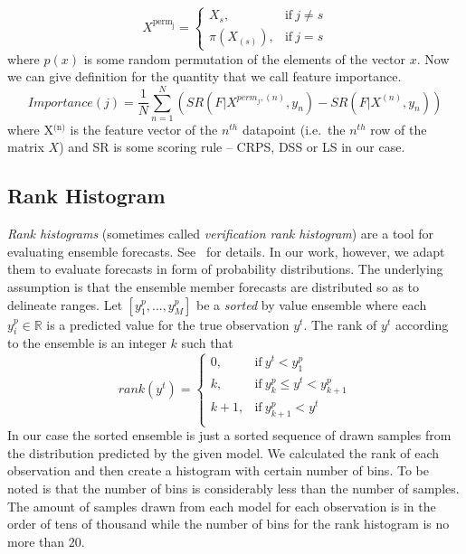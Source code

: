 \documentclass[12pt,a4paper,twoside]{scrartcl}
\numberwithin{equation}{section}
\begin{document}
\begin{equation}
  X^{\text{perm}_{\text{j}}} = 
  \begin{cases}
    X_{s},        & \text{if}\  j \neq s \\
    \pi(X_{(s)}), & \text{if}\  j = s
  \end{cases}
\end{equation}
where \(p(x)\) is some random permutation of the elements of the vector \(x\). Now we can give definition for the quantity that we call feature importance.
\begin{equation}
  \textit{Importance}(j) = \frac{1}{N}\sum_{n=1}^N (SR(F|X^{perm_j,(n)}, y_n) - SR(F|X^{(n)}, y_n) )
\end{equation}
where X\(^{\text{(n)}}\) is the feature vector of the \(n^{th}\) datapoint (i.e.\ the \(n^{th}\) row of the matrix \(X\)) and SR is some scoring rule -- CRPS, DSS or LS in our case.
\subsection{Rank Histogram}\label{sec:rank-hist}
\emph{Rank histograms} (sometimes called \emph{verification rank histogram}) are a tool for evaluating ensemble forecasts. See~\cite{hamill2001} for details. In our work, however, we adapt them to evaluate forecasts in form of probability distributions. The underlying assumption is that the ensemble member forecasts are distributed so as to delineate ranges. Let \([y_1^p,\ldots , y_M^p]\) be a \emph{sorted} by value ensemble where each \(y_i^p\in\mathbb{R}\) is a predicted value for the true observation \(y^t\). The rank of \(y^t\) according to the ensemble is an integer \(k\) such that
\begin{equation}
  rank(y^t)=
  \begin{cases}
    0,   & \text{if}\  y^t < y_1^p \\
    k,   & \text{if}\  y_{k}^p \leq y^t < y_{k+1}^p  \\
    k+1, & \text{if}\  y_{k+1}^p <  y^t  \\
  \end{cases}
\end{equation}
In our case the sorted ensemble is just a sorted sequence of drawn samples from the distribution predicted by the given model. We calculated the rank of each observation and then create a histogram with certain number of bins. To be noted is that the number of bins is considerably less than the number of samples. The amount of samples drawn from each model for each observation is in the order of tens of thousand while the number of bins for the rank histogram is no more than 20.
\end{document}
